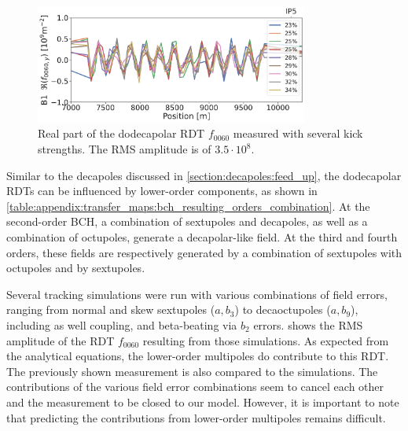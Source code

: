 \begin{figure}[!htb]
    \centering
    \includegraphics[width=0.8\textwidth]{./images/f0060y_all_meas_real.pdf}
    \caption{Real part of the dodecapolar RDT $f_{0060}$ measured with several kick strengths. The
    RMS amplitude is of $3.5\cdot10^{8}$.}
    \label{fig:high_orders:dodecapolar_f0060}
\end{figure}

Similar to the decapoles discussed in \cref{section:decapoles:feed_up}, the dodecapolar RDTs can be
influenced by lower-order components, as shown in
\cref{table:appendix:transfer_maps:bch_resulting_orders_combination}. At the second-order BCH, a
combination of sextupoles and decapoles, as well as a combination of octupoles, generate a
decapolar-like field. At the third and fourth orders, these fields are respectively generated by a
combination of sextupoles with octupoles and by sextupoles.

Several tracking simulations were run with various combinations of field errors, ranging from normal
and skew sextupoles ($a,b_3$) to decaoctupoles ($a,b_9$), including as well coupling, and
beta-beating via $b_2$ errors.  shows the RMS amplitude of
the RDT $f_{0060}$ resulting from those simulations. As expected from the analytical equations, the
lower-order multipoles do contribute to this RDT. The previously shown measurement is also compared
to the simulations. The contributions of the various field error combinations seem to cancel each
other and the measurement to be closed to our model. However, it is important to note that
predicting the contributions from lower-order multipoles remains difficult.

